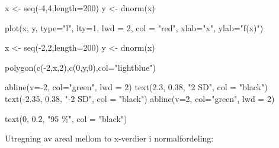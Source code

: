 \documentclass[
]{book}
\newenvironment{Shaded}{\begin{snugshade}}{\end{snugshade}}
\newcommand{\AttributeTok}[1]{\textcolor[rgb]{0.77,0.63,0.00}{#1}}
\newcommand{\DecValTok}[1]{\textcolor[rgb]{0.00,0.00,0.81}{#1}}
\newcommand{\FloatTok}[1]{\textcolor[rgb]{0.00,0.00,0.81}{#1}}
\newcommand{\FunctionTok}[1]{\textcolor[rgb]{0.00,0.00,0.00}{#1}}
\newcommand{\NormalTok}[1]{#1}
\newcommand{\OtherTok}[1]{\textcolor[rgb]{0.56,0.35,0.01}{#1}}
\newcommand{\SpecialCharTok}[1]{\textcolor[rgb]{0.00,0.00,0.00}{#1}}
\newcommand{\StringTok}[1]{\textcolor[rgb]{0.31,0.60,0.02}{#1}}
\begin{document}
\begin{Shaded}
\begin{Highlighting}[]
\NormalTok{x }\OtherTok{\textless{}{-}} \FunctionTok{seq}\NormalTok{(}\SpecialCharTok{{-}}\DecValTok{4}\NormalTok{,}\DecValTok{4}\NormalTok{,}\AttributeTok{length=}\DecValTok{200}\NormalTok{)}
\NormalTok{y }\OtherTok{\textless{}{-}} \FunctionTok{dnorm}\NormalTok{(x)}

\FunctionTok{plot}\NormalTok{(x, y, }\AttributeTok{type=}\StringTok{"l"}\NormalTok{, }\AttributeTok{lty=}\DecValTok{1}\NormalTok{, }\AttributeTok{lwd =} \DecValTok{2}\NormalTok{, }\AttributeTok{col =} \StringTok{"red"}\NormalTok{, }\AttributeTok{xlab=}\StringTok{"x"}\NormalTok{,}
  \AttributeTok{ylab=}\StringTok{"f(x)"}\NormalTok{)}

\NormalTok{x }\OtherTok{\textless{}{-}} \FunctionTok{seq}\NormalTok{(}\SpecialCharTok{{-}}\DecValTok{2}\NormalTok{,}\DecValTok{2}\NormalTok{,}\AttributeTok{length=}\DecValTok{200}\NormalTok{)}
\NormalTok{y }\OtherTok{\textless{}{-}} \FunctionTok{dnorm}\NormalTok{(x)}

\FunctionTok{polygon}\NormalTok{(}\FunctionTok{c}\NormalTok{(}\SpecialCharTok{{-}}\DecValTok{2}\NormalTok{,x,}\DecValTok{2}\NormalTok{),}\FunctionTok{c}\NormalTok{(}\DecValTok{0}\NormalTok{,y,}\DecValTok{0}\NormalTok{),}\AttributeTok{col=}\StringTok{"lightblue"}\NormalTok{)}

\FunctionTok{abline}\NormalTok{(}\AttributeTok{v=}\SpecialCharTok{{-}}\DecValTok{2}\NormalTok{, }\AttributeTok{col=}\StringTok{"green"}\NormalTok{, }\AttributeTok{lwd =} \DecValTok{2}\NormalTok{)}
\FunctionTok{text}\NormalTok{(}\FloatTok{2.3}\NormalTok{, }\FloatTok{0.38}\NormalTok{, }\StringTok{"2 SD"}\NormalTok{, }\AttributeTok{col =} \StringTok{"black"}\NormalTok{)}
\FunctionTok{text}\NormalTok{(}\SpecialCharTok{{-}}\FloatTok{2.35}\NormalTok{, }\FloatTok{0.38}\NormalTok{, }\StringTok{"{-}2 SD"}\NormalTok{, }\AttributeTok{col =} \StringTok{"black"}\NormalTok{)}
\FunctionTok{abline}\NormalTok{(}\AttributeTok{v=}\DecValTok{2}\NormalTok{, }\AttributeTok{col=}\StringTok{"green"}\NormalTok{, }\AttributeTok{lwd =} \DecValTok{2}\NormalTok{)}

\FunctionTok{text}\NormalTok{(}\DecValTok{0}\NormalTok{, }\FloatTok{0.2}\NormalTok{, }\StringTok{"95 \%"}\NormalTok{, }\AttributeTok{col =} \StringTok{"black"}\NormalTok{)}
\end{Highlighting}
\end{Shaded}

Utregning av areal mellom to x-verdier i normalfordeling:
\end{document}

